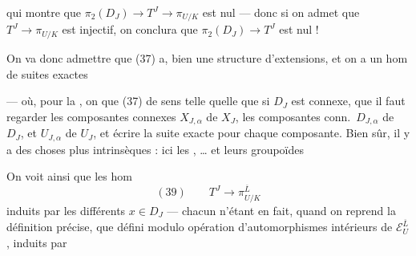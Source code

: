 \documentclass[11pt,a4paper]{article}
\begin{document}
qui montre que  $\pi_2(D_J) \to T^J \to \pi_{U/K}$ est nul — donc si on admet que $T^J \to \pi_{U/K}$ est injectif, on conclura que $\pi_2(D_J) \to T^J$ est nul !


On va donc admettre que (37) a,  bien une structure d'extensions, et on a  un hom de suites exactes



— où, pour  la , on     que (37) \ill{} de sens telle quelle que si  $D_J$ est connexe, que  il faut regarder les composantes connexes $X_{J,\alpha}$ de $X_J$,  les composantes conn.\ $D_{J,\alpha}$ de $D_J$, et $U_{J,\alpha}$ de $U_J$, et écrire la suite exacte pour chaque composante. Bien sûr, il y a des choses plus intrinsèques : ici  les   , … et leurs groupoïdes 

On voit ainsi que les hom
\[
  (39) \qquad T^{J} \longrightarrow \pi_{U/K}^{\overline{L}}
\]
induits par les différents $x \in D_J$ — chacun n'étant en fait, quand on reprend la définition précise, que défini modulo opération d'automorphismes intérieurs de $\mathcal{E}_U^{\overline{L}}$, induits par
\end{document}
